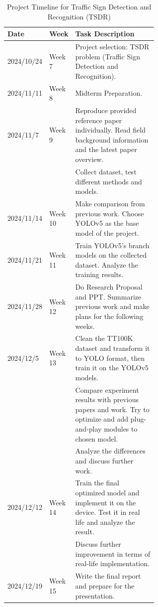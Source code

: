 \documentclass[letterpaper, 10 pt, conference]{ieeeconf}
\begin{document}
\begin{table}[H]
    \centering
    \caption{Project Timeline for Traffic Sign Detection and Recognition (TSDR)}
    \begin{tabular}{@{}llp{0.6\linewidth}@{}}
    \toprule
    \textbf{Date}         & \textbf{Week} & \textbf{Task Description}                                                                                                 \\ \midrule
    2024/10/24            & Week 7        & Project selection: TSDR problem (Traffic Sign Detection and Recognition).                                                 \\
    2024/11/11            & Week 8        & Midterm Preparation.                                                                                                      \\
    2024/11/7             & Week 9        & Reproduce provided reference paper individually. Read field background information and the latest paper overview. \\
                           &               & Collect dataset, test different methods and models.                                                                       \\
    2024/11/14            & Week 10       & Make comparison from previous work. Choose YOLOv5 as the base model of the project.                                       \\
    2024/11/21            & Week 11       & Train YOLOv5's branch models on the collected dataset. Analyze the training results.                                      \\
    2024/11/28            & Week 12       & Do Research Proposal and PPT. Summarize previous work and make plans for the following weeks.                             \\
    2024/12/5             & Week 13       & Clean the TT100K dataset and transform it to YOLO format, then train it on the YOLOv5 models.                             \\
                           &               & Compare experiment results with previous papers and work. Try to optimize and add plug-and-play modules to chosen model.  \\
                           &               & Analyze the differences and discuss further work.                                                                         \\
    2024/12/12            & Week 14       & Train the final optimized model and implement it on the device. Test it in real life and analyze the result.              \\
                           &               & Discuss further improvement in terms of real-life implementation.                                                        \\
    2024/12/19            & Week 15       & Write the final report and prepare for the presentation.                                                                  \\ \bottomrule
    \end{tabular}
    \end{table}
\end{document}
